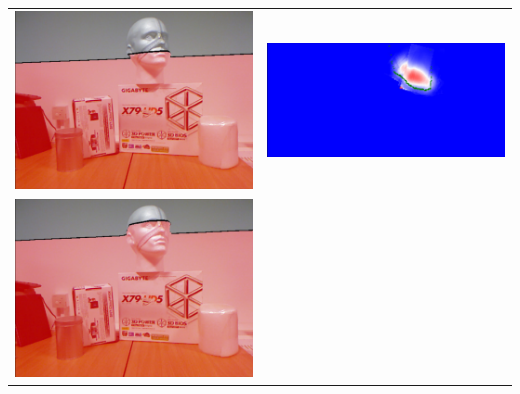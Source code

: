 \documentclass[10pt,onecolumn,letterpaper]{article}
\begin{document}
\begin{tabular}{cc}
\includegraphics[height=\imheight]{real/head/rgb_00150.jpg} &
\includegraphics[height=\imheight]{real/head/slice_00150.jpg} \\
\includegraphics[height=\imheight]{real/head/rgb_00170.jpg} &

\end{tabular}
\end{document}
